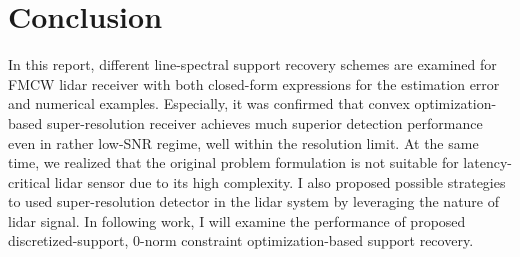 \documentclass[11pt,journal, onecolumn]{IEEEtran}
\theoremstyle{theorem}
\begin{document}


\section{Conclusion}

In this report, different line-spectral support recovery schemes are examined for FMCW lidar receiver with both closed-form expressions for the estimation error and numerical examples. Especially, it was confirmed that convex optimization-based super-resolution receiver achieves much superior detection performance even in rather low-SNR regime, well within the resolution limit. At the same time, we realized that the original problem formulation is not suitable for latency-critical lidar sensor due to its high complexity. I also proposed possible strategies to used super-resolution detector in the lidar system by leveraging the nature of lidar signal. In following work, I will examine the performance of proposed discretized-support, 0-norm constraint optimization-based support recovery. 
\end{document}
